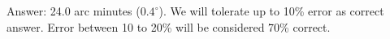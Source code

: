 Answer: 24.0 arc minutes ($0.4^\circ$). We will tolerate up to 10\% error
as correct answer. Error between 10 to 20\% will be considered 70\%
correct.
